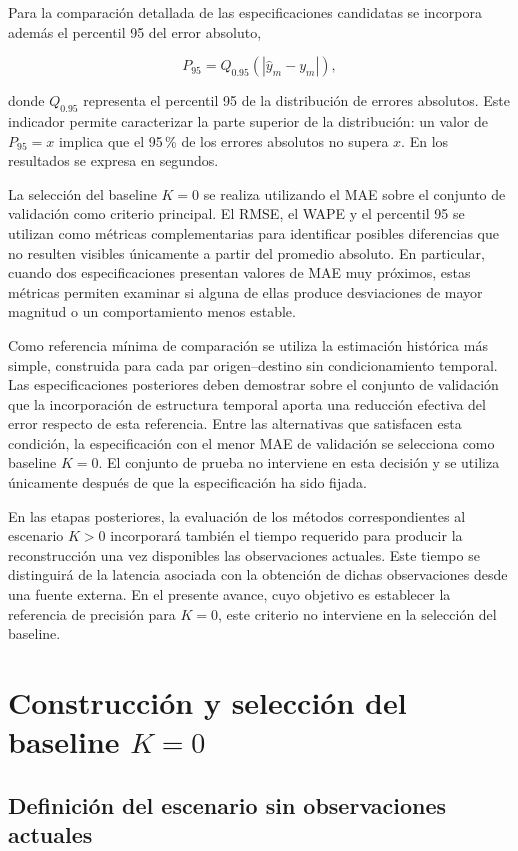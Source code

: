 \documentclass[11pt]{article}
\begin{document}
Para la comparación detallada de las especificaciones candidatas se incorpora además el percentil 95 del error absoluto,

\[
P_{95}
=
Q_{0.95}
\left(
\left|
\widehat{y}_m-y_m
\right|
\right),
\]

donde $Q_{0.95}$ representa el percentil 95 de la distribución de errores absolutos. Este indicador permite caracterizar la parte superior de la distribución: un valor de $P_{95}=x$ implica que el 95\,\% de los errores absolutos no supera $x$. En los resultados se expresa en segundos.

La selección del baseline $K=0$ se realiza utilizando el MAE sobre el conjunto de validación como criterio principal. El RMSE, el WAPE y el percentil 95 se utilizan como métricas complementarias para identificar posibles diferencias que no resulten visibles únicamente a partir del promedio absoluto. En particular, cuando dos especificaciones presentan valores de MAE muy próximos, estas métricas permiten examinar si alguna de ellas produce desviaciones de mayor magnitud o un comportamiento menos estable.

Como referencia mínima de comparación se utiliza la estimación histórica más simple, construida para cada par origen--destino sin condicionamiento temporal. Las especificaciones posteriores deben demostrar sobre el conjunto de validación que la incorporación de estructura temporal aporta una reducción efectiva del error respecto de esta referencia. Entre las alternativas que satisfacen esta condición, la especificación con el menor MAE de validación se selecciona como baseline $K=0$. El conjunto de prueba no interviene en esta decisión y se utiliza únicamente después de que la especificación ha sido fijada.

En las etapas posteriores, la evaluación de los métodos correspondientes al escenario $K>0$ incorporará también el tiempo requerido para producir la reconstrucción una vez disponibles las observaciones actuales. Este tiempo se distinguirá de la latencia asociada con la obtención de dichas observaciones desde una fuente externa. En el presente avance, cuyo objetivo es establecer la referencia de precisión para $K=0$, este criterio no interviene en la selección del baseline.

\section{Construcción y selección del baseline $K=0$}

\subsection{Definición del escenario sin observaciones actuales}
\end{document}
